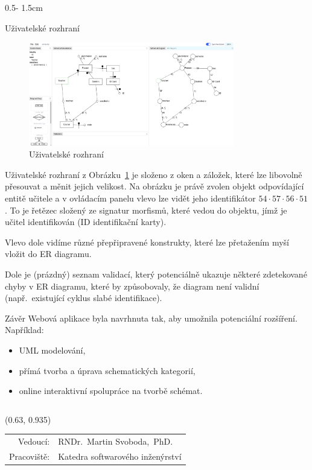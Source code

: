 \documentclass[a0paper]{uioposter}
\begin{document}
\begin{frame}
\begin{columns}[onlytextwidth]
    \begin{column}{0.5\textwidth - 1.5cm}
      \begin{block}{Uživatelské rozhraní}
        \begin{figure}
          \centering
          \includegraphics[width=0.8\textwidth]{./images/identifier-screenshot.png}
          \caption{Uživatelské rozhraní}
          \label{fig:user-interface}
        \end{figure}

        Uživatelské rozhraní z Obrázku~\ref{fig:user-interface} je složeno z oken a záložek, které lze libovolně přesouvat a měnit jejich velikost.
        Na obrázku je právě zvolen objekt odpovídající entitě učitele a v ovládacím panelu vlevo lze vidět jeho identifikátor $54\cdot 57\cdot 56\cdot 51$.
        To je řetězec složený ze signatur morfismů, které vedou do objektu, jímž je učitel identifikován (ID identifikační karty).

        Vlevo dole vidíme různé přepřipravené konstrukty, které lze přetažením myší vložit do ER diagramu.

        Dole je (prázdný) seznam validací, který potenciálně ukazuje některé zdetekované chyby v ER diagramu, které by způsobovaly, že diagram není validní (např.~existující cyklus slabé identifikace).
      \end{block}
      \begin{block}{Závěr}
          Webová aplikace byla navrhnuta tak, aby umožnila potenciální rozšíření.
          Například:
          \begin{itemize}
              \item UML modelování,
              \item přímá tvorba a úprava schematických kategorií,
              \item online interaktivní spolupráce na tvorbě schémat.
          \end{itemize}
      \end{block}
    \end{column}
  \end{columns}


  \begin{textblock}{0.5}(0.63, 0.935)
    \color{white}
    \sffamily
    \begin{tabular}{rl}
      Vedoucí:    & RNDr.~Martin Svoboda,~PhD.
      \\
      Pracoviště: & Katedra softwarového inženýrství
    \end{tabular}
  \end{textblock}


\end{frame}
\end{document}
